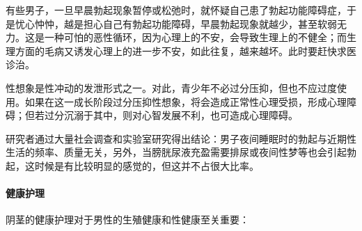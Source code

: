 有些男子，一旦早晨勃起现象暂停或松弛时，就怀疑自己患了勃起功能障碍症，于是忧心忡忡，越是担心自己有勃起功能障碍，早晨勃起现象就越少，甚至软弱无力。这是一种可怕的恶性循环，因为心理上的不安，会导致生理上的不健全；而生理方面的毛病又诱发心理上的进一步不安，如此往复，越来越坏。此时要赶快求医诊治。

性想象是性冲动的发泄形式之一。对此，青少年不必过分压抑，但也不应过度使用。如果在这一成长阶段过分压抑性想象，将会造成正常性心理受损，形成心理障碍；但若过分沉溺于其中，则对心智发展不利，也可造成心理障碍。

研究者通过大量社会调查和实验室研究得出结论：男子夜间睡眠时的勃起与近期性生活的频率、质量无关，另外，当膀胱尿液充盈需要排尿或夜间性梦等也会引起勃起，这时候是有比较明显的感觉的，但这并不占很大比率。

\paragraph{健康护理}

阴茎的健康护理对于男性的生殖健康和性健康至关重要：

